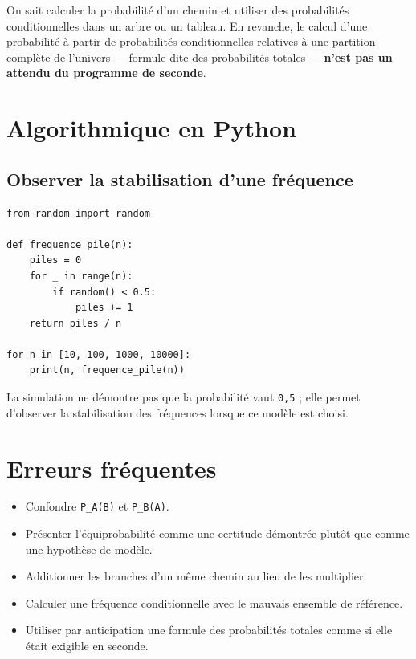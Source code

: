 On sait calculer la probabilité d'un chemin et utiliser des probabilités conditionnelles dans un arbre ou un tableau. En revanche, le calcul d'une probabilité à partir de probabilités conditionnelles relatives à une partition complète de l'univers — formule dite des probabilités totales — \textbf{n'est pas un attendu du programme de seconde}.


\section{Algorithmique en Python}

\subsection{Observer la stabilisation d'une fréquence}

\begin{verbatim}
from random import random

def frequence_pile(n):
    piles = 0
    for _ in range(n):
        if random() < 0.5:
            piles += 1
    return piles / n

for n in [10, 100, 1000, 10000]:
    print(n, frequence_pile(n))
\end{verbatim}

La simulation ne démontre pas que la probabilité vaut \texttt{0,5} ; elle permet d'observer la stabilisation des fréquences lorsque ce modèle est choisi.

\section{Erreurs fréquentes}

\begin{itemize}
\item Confondre \texttt{P_A(B)} et \texttt{P_B(A)}.
\item Présenter l'équiprobabilité comme une certitude démontrée plutôt que comme une hypothèse de modèle.
\item Additionner les branches d'un même chemin au lieu de les multiplier.
\item Calculer une fréquence conditionnelle avec le mauvais ensemble de référence.
\item Utiliser par anticipation une formule des probabilités totales comme si elle était exigible en seconde.
\end{itemize}


